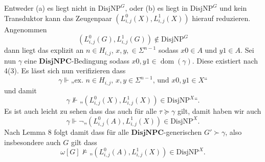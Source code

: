 \documentclass[nofonts]{uebung}
\def\DisjNP{\ensuremath{\mathrm{DisjNP}}}
\DeclareMathOperator{\dom}{dom}
\begin{document}
Entweder (a) es liegt nicht in $\DisjNP^G$, oder (b) es liegt in $\DisjNP^G$ und kein Transduktor kann das Zeugenpaar $(L^0_{i,j}(X), L^1_{i,j}(X))$ hierauf reduzieren. 
Angenommen 
\[ (L^0_{i,j}(G), L^1_{i,j}(G))\not\in\DisjNP^G \]
dann liegt das explizit an $n\in H_{i,j}$, $x,y,\in\Sigma^{n-1}$ sodass $x0\in A$ und $y1\in A$.
Sei nun $\gamma$ eine $\mathbf{DisjNPC}$-Bedingung sodass $x0,y1\in\dom(\gamma)$. Diese existiert nach 4(3).
Es lässt sich nun verifizieren dass
\[ \gamma \Vdash „\text{ex. $n\in H_{i,j}$, $x,y\in\Sigma^{n-1}$, und $x0,y1\in X$}“ \]
und damit 
\[ \gamma \not\Vdash „(L^0_{i,j}(X), L^1_{i,j}(X))\in\DisjNP^X“. \]
Es ist auch leicht zu sehen dass das auch für alle $\tau\succeq\gamma$ gilt, damit haben wir auch
\[ \gamma \Vdash \neg„(L^0_{i,j}(A), L^1_{i,j}(X))\in\DisjNP^X. \]
Nach Lemma 8 folgt damit dass für alle $\mathbf{DisjNPC}$-generischen $G'\succ\gamma$, also insbesondere auch $G$ gilt dass
\[ \omega[G] \not\vDash „(L^0_{i,j}(A), L^1_{i,j}(X))\in\DisjNP^X. \]
\end{document}
